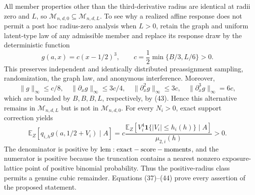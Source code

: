 All member properties other than the third-derivative radius are identical at radii zero and \(L\), so \(\mathcal M_{n,d,0}\subseteq\mathcal M_{n,d,L}\).  To see why a realized affine response does not permit a post hoc radius-zero analysis when \(L>0\), retain the graph and uniform latent-type law of any admissible member and replace its response draw by the deterministic function
\[
 g(a,x)=c(x-1/2)^3,
 \qquad c=\frac12\min\{B/3,L/6\}>0.
\tag{43}
\]
This preserves independent and identically distributed preassignment sampling, randomization, the graph law, and anonymous interference.  Moreover,
\[
 \|g\|_\infty\le c/8,\quad
 \|\partial_xg\|_\infty\le3c/4,\quad
 \|\partial_x^2g\|_\infty\le3c,\quad
 \|\partial_x^3g\|_\infty=6c,
\]
which are bounded by \(B,B,B,L\), respectively, by (43).  Hence this alternative remains in \(\mathcal M_{n,d,L}\) but is not in \(\mathcal M_{n,d,0}\).  For every \(N_i>0\), exact support correction yields
\[
 \mathbb E_Z[q_{i,h}g(a,1/2+V_i)\mid A]
 =c\frac{\mathbb E_Z[V_i^4\mathbf1\{|V_i|\le h_i(h)\}\mid A]}
          {\mu_{2,i}(h)}>0.
\tag{44}
\]
The denominator is positive by \({\rm lem:exact-score-moments}\), and the numerator is positive because the truncation contains a nearest nonzero exposure-lattice point of positive binomial probability.  Thus the positive-radius class permits a genuine cubic remainder.  Equations (37)--(44) prove every assertion of the proposed statement.